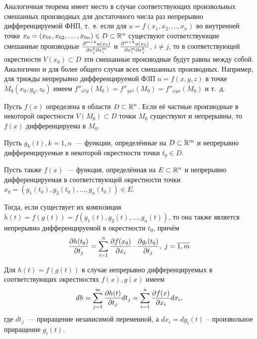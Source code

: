 \documentclass[../main.tex]{subfiles}
\begin{document}
\begin{remark}
		Аналогичная теорема имеет место в случае соответствующих 
		произвольных смешанных производных для достаточного числа 
		раз непрерывно дифференцируемой ФНП, т.~е. если для 
		$u = f\left(x_1, x_2,\dots, x_n\right)$ во внутренней 
		точке $x_0 = \left(x_{01}, x_{02},\dots, x_{0n}\right)
		\in D\subset \mathbb{R}^n$ существуют соответствующие смешанные 
		производные $\frac{\partial ^{m+k}u\left(x_0\right)}{\partial x_j^k\partial x_i^m}$ и 
		$\frac{\partial ^{m+k}u\left(x_0\right)}{\partial x_i^m\partial x_j^k}$, $i\ne j$, 
		то в соответствующей окрестности $V\left(x_0\right)\subset D$ эти 
		смешанные производные будут равны между собой. Аналогично и для более 
		общего случая всех смешанных производных. Например, для трижды 
		непрерывно дифференцируемой Ф3П $u=f\left(x, y, z\right)$ в точке 
		$M_0\left(x_0, y_0, z_0\right)$ имеем
		$f''_{x^2y}\left(M_0\right) = f''_{yx^2}\left(M_0\right) = 
		f''_{xyx}\left(M_0\right)$ и т.~д.
	\end{remark}
\begin{thm}
Пусть $f(x)$ определена в области $D \subset \mathbb{R}^n$. Если её
частные производные в некоторой окрестности $V(M_0)\subset D$ точки
$M_0$ существуют и непрерывны, то $f(x)$ дифференцируема в $M_0$.
\end{thm}
\begin{thm}
Пусть $g_k(t),k=\overline{1,n}$~--- функции, определённые на 
$D\subset\mathbb{R}^m$ и непрерывно дифференцируемые в некоторой окрестности 
точки $t_0\in D$.

Пусть также $f(x)$~--- функция, определённая на $E\subset\mathbb{R}^n$ и
непрерывно дифференцируемая в соответствующей окрестности точки $x_0 = 
(g_1(t_0),g_2(t_0),\dots,g_n(t_0))\in E$.

Тогда, если существует их композиция $h(t) = f(g(t)) =
f(g_1(t),g_2(t),\dots,g_n(t))$, то она также является непрерывно 
дифференцируемой в окрестности $t_0$, причём
\[\frac{\partial h(t_0)}{\partial t_j}=\sum_{i=1}^{n}
\frac{\partial f(x_0)}{\partial x_i}\cdot
\frac{\partial g_i(t_0)}{\partial t_j},\ j=\overline{1,m}\]
\end{thm}
\begin{crl}
Для $h(t) = f(g(t))$ в случае непрерывно дифференцируемых в 
соответствующих окрестностях $f(x), g(x)$ имеем
\[dh=\sum_{j=1}^m\frac{\partial h(t)}{\partial t_j}dt_j=
\sum_{i=1}^n\frac{\partial f(x)}{\partial x_i}dx_i,\]
где $dt_j$~--- приращение независимой переменной, а $dx_i=dg_i(t)$ --
произвольное приращение $g_i(t)$.
\end{crl}
\end{document}
